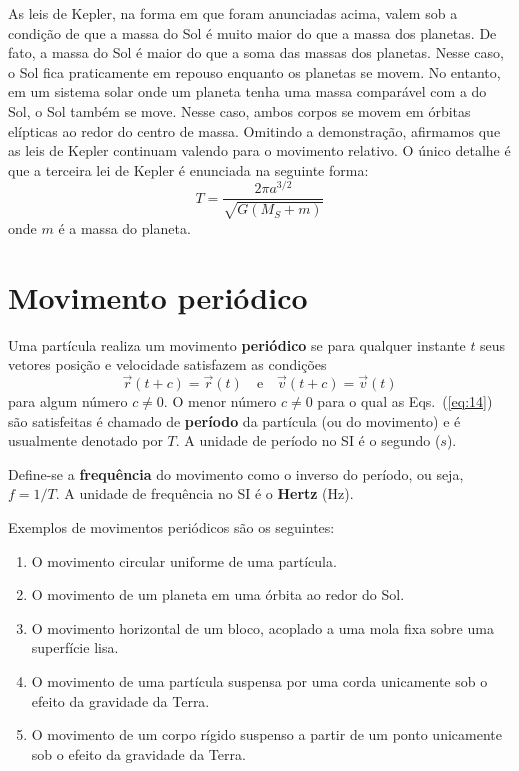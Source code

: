 \documentclass[12pt,a4paper]{article}
\theoremstyle{definition}
\begin{document}
As leis de Kepler, na forma em que foram anunciadas acima, valem sob a
condição de que a massa do Sol é muito maior do que a massa dos
planetas. De fato, a massa do Sol é maior do que a soma das massas dos
planetas. Nesse caso, o Sol fica praticamente em repouso enquanto os
planetas se movem. No entanto, em um sistema solar onde um planeta
tenha uma massa comparável com a do Sol, o Sol também se move. Nesse
caso, ambos corpos se movem em órbitas elípticas ao redor do centro de
massa. Omitindo a demonstração, afirmamos que as leis de Kepler
continuam valendo para o movimento relativo. O único detalhe é que a
terceira lei de Kepler é enunciada na seguinte forma:
$$T=\frac{2\pi a^{3/2}}{\sqrt{G(M_S+m)}}$$
onde $m$ é a massa do planeta.

\section{Movimento periódico}
Uma partícula realiza um movimento \textbf{periódico} se para qualquer
instante $t$ seus vetores posição e velocidade satisfazem as condições
\begin{equation}
  \label{eq:14}
  \vec r(t+c)=\vec r(t)\quad\text{e}\quad\vec v(t+c)=\vec v(t)
\end{equation}
para algum número $c\ne 0$. O menor número $c\ne 0$ para o qual as
Eqs.~(\ref{eq:14}) são satisfeitas é chamado de \textbf{período} da
partícula (ou do movimento) e é usualmente denotado por $T$. A unidade
de período no SI é o segundo ($s$).

Define-se a \textbf{frequência} do movimento como o inverso do
período, ou seja, $f=1/T$. A unidade de frequência no SI é o
\textbf{Hertz} ($\mathrm{Hz}$).

Exemplos de movimentos periódicos são os seguintes:
\begin{enumerate}
\item O movimento circular uniforme de uma partícula.
\item O movimento de um planeta em uma órbita ao redor do Sol.
\item O movimento horizontal de um bloco, acoplado a uma mola fixa
  sobre uma superfície lisa.
\item O movimento de uma partícula suspensa por uma corda unicamente
  sob o efeito da gravidade da Terra.
\item O movimento de um corpo rígido suspenso a partir de um ponto
  unicamente sob o efeito da gravidade da Terra.
\end{enumerate}
\end{document}
